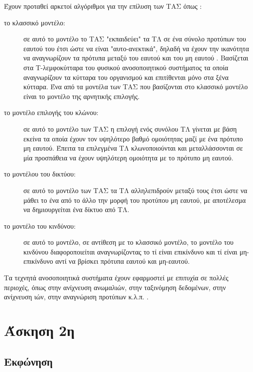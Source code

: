 \documentclass{assignment}
\begin{document}
Έχουν προταθεί αρκετοί αλγόριθμοι για την επίλυση των ΤΑΣ όπως \cite{engelbrecht}:
\begin{description}

\item[το κλασσικό μοντέλο:] σε αυτό το μοντέλο το ΤΑΣ "εκπαιδεύει" τα ΤΛ σε ένα σύνολο προτύπων του εαυτού του έτσι ώστε να είναι "αυτο-ανεκτικά", δηλαδή να έχουν την ικανότητα να αναγνωρίζουν τα πρότυπα μεταξύ του εαυτού και του μη εαυτού \cite{engelbrecht}. Βασίζεται στα Τ-λεμφοκύτταρα του φυσικού ανοσοποιητικού συστήματος τα οποία αναγνωρίζουν τα κύτταρα του οργανισμού και επιτίθενται μόνο στα ξένα κύτταρα. Ένα από τα μοντέλα των ΤΑΣ που βασίζονται στο κλασσικό μοντέλο είναι το μοντέλο της αρνητικής επιλογής.

\item[το μοντέλο επιλογής του κλώνου:]  σε αυτό το μοντέλο των ΤΑΣ η επιλογή ενός συνόλου ΤΛ γίνεται με βάση εκείνα τα οποία έχουν τον υψηλότερο βαθμό ομοιότητας μαζί με ένα πρότυπο μη εαυτού. Έπειτα τα επιλεγμένα ΤΛ κλωνοποιούνται και μεταλλάσσονται σε μία προσπάθεια να έχουν υψηλότερη ομοιότητα με το πρότυπο μη εαυτού.

\item[το μοντέλου του δικτύου:] σε αυτό το μοντέλο των ΤΑΣ τα ΤΛ αλληλεπιδρούν μεταξύ τους έτσι ώστε να μάθει το ένα από το άλλο την μορφή του προτύπου μη εαυτού, με αποτέλεσμα να δημιουργείται ένα δίκτυο από ΤΛ.

\item[το μοντέλο του κινδύνου:] σε αυτό το μοντέλο, σε αντίθεση με το κλασσικό μοντέλο, το μοντέλο του κινδύνου διαφοροποιείται αναγνωρίζοντας το τί είναι επικίνδυνο και τί είναι μη-επικίνδυνο αντί να βρίσκει πρότυπα εαυτού και μη-εαυτού.

\end{description}

Τα τεχνητά ανοσοποιητικά συστήματα έχουν εφαρμοστεί με επιτυχία σε πολλές περιοχές, όπως στην ανίχνευση ανωμαλιών, στην ταξινόμηση δεδομένων, στην ανίχνευση ιών, στην αναγνώριση προτύπων κ.λ.π. \cite{wiki:artificial_immune_system, engelbrecht, karakasis_thesis}.

\section{Άσκηση 2η}
\subsection{Εκφώνηση}
\end{document}
